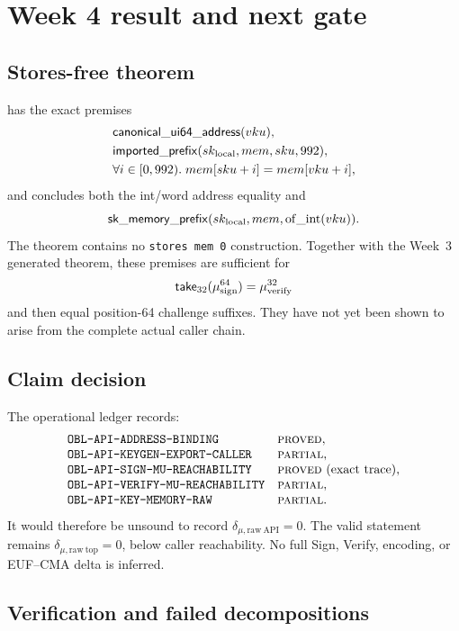 \section{Week 4 result and next gate}

\subsection{Stores-free theorem}

 has the exact premises
\[
\begin{split}
  &\mathsf{canonical\_ui64\_address}(vku),\\
  &\mathsf{imported\_prefix}(sk_{\rm local},mem,sku,992),\\
  &\forall i\in[0,992).\;mem[sku+i]=mem[vku+i],
\end{split}
\]
and concludes both the int/word address equality and
\[
  \mathsf{sk\_memory\_prefix}
    (sk_{\rm local},mem,\operatorname{of\_int}(vku)).
\]
The theorem contains no \texttt{stores mem 0} construction.  Together with
the Week~3 generated theorem, these premises are sufficient for
\[
  \mathsf{take}_{32}(\mu_{\rm sign}^{64})=\mu_{\rm verify}^{32}
\]
and then equal position-64 challenge suffixes.  They have not yet been shown
to arise from the complete actual caller chain.

\subsection{Claim decision}

The operational ledger records:
\[
\begin{array}{ll}
\claimid{OBL-API-ADDRESS-BINDING} & \status{proved},\\
\claimid{OBL-API-KEYGEN-EXPORT-CALLER} & \status{partial},\\
\claimid{OBL-API-SIGN-MU-REACHABILITY} & \status{proved}~\text{(exact trace)},\\
\claimid{OBL-API-VERIFY-MU-REACHABILITY} & \status{partial},\\
\claimid{OBL-API-KEY-MEMORY-RAW} & \status{partial}.
\end{array}
\]
It would therefore be unsound to record
\(\delta_{\mu,\mathrm{raw\ API}}=0\).  The valid statement remains
\(\delta_{\mu,\mathrm{raw\ top}}=0\), below caller reachability.  No full
Sign, Verify, encoding, or EUF--CMA delta is inferred.

\subsection{Verification and failed decompositions}

